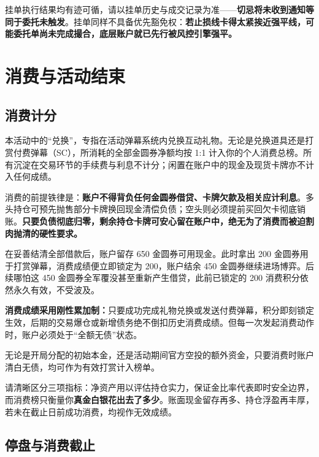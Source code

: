 \documentclass[11pt,a4paper,twoside]{article}
\newcommand{\gold}{金圆券}
\begin{document}
挂单执行结果均有迹可循，请以挂单历史与成交记录为准——\textbf{切忌将未收到通知等同于委托未触发}。挂单同样不具备优先豁免权：\textbf{若止损线卡得太紧挨近强平线，可能委托单尚未完成撮合，底层账户就已先行被风控引擎强平。}

\section{消费与活动结束}

\subsection{消费计分}
本活动中的“兑换”，专指在活动弹幕系统内兑换互动礼物。无论是兑换道具还是打赏付费弹幕（SC），所消耗的全部\gold{}净额均按 1:1 计入你的个人消费总榜。所有沉淀在交易环节的手续费与利息不计分；闲置在账户中的现金及现货卡牌亦不计入任何成绩。

消费的前提铁律是：\textbf{账户不得背负任何\gold{}借贷、卡牌欠款及相关应计利息}。多头持仓可预先抛售部分卡牌换回现金清偿负债；空头则必须提前买回欠卡彻底销账。\textbf{只要负债彻底归零，剩余持仓卡牌可安心留在账户中，绝无为了消费而被迫割肉抛清的硬性要求。}

\begin{exbox}[title={例：盈利先落袋消费，再整队出击},breakable=false]
在妥善结清全部借款后，账户留存 650 \gold{}可用现金。此时拿出 200 \gold{}用于打赏弹幕，消费成绩便立即锁定为 200，账户结余 450 \gold{}继续进场博弈。后续哪怕这 450 \gold{}全军覆没甚至重新产生借贷，此前已锁定的 200 消费积分依然永久有效，不受波及。
\end{exbox}

\begin{notebox}
\textbf{消费成绩采用刚性累加制：}只要成功完成礼物兑换或发送付费弹幕，积分即刻锁定生效，后期的交易爆仓或新增债务绝不倒扣历史消费成绩。但每一次发起消费动作时，账户必须处于“全额无债”状态。
\end{notebox}

无论是开局分配的初始本金，还是活动期间官方空投的额外资金，只要消费时账户清白无债，均可作为有效打赏计入榜单。

请清晰区分三项指标：净资产用以评估持仓实力，保证金比率代表即时安全边界，而消费榜只衡量你\textbf{真金白银花出去了多少}。账面现金留存再多、持仓浮盈再丰厚，若未在截止日前成功消费，均视作无效成绩。

\Needspace{90mm}
\subsection{停盘与消费截止}
\end{document}
